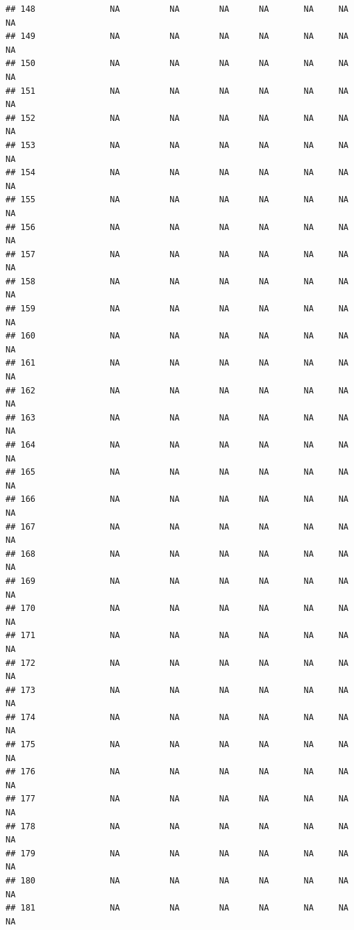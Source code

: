 \documentclass[
]{article}
\begin{document}
\begin{verbatim}
## 148               NA          NA        NA      NA       NA     NA     NA
## 149               NA          NA        NA      NA       NA     NA     NA
## 150               NA          NA        NA      NA       NA     NA     NA
## 151               NA          NA        NA      NA       NA     NA     NA
## 152               NA          NA        NA      NA       NA     NA     NA
## 153               NA          NA        NA      NA       NA     NA     NA
## 154               NA          NA        NA      NA       NA     NA     NA
## 155               NA          NA        NA      NA       NA     NA     NA
## 156               NA          NA        NA      NA       NA     NA     NA
## 157               NA          NA        NA      NA       NA     NA     NA
## 158               NA          NA        NA      NA       NA     NA     NA
## 159               NA          NA        NA      NA       NA     NA     NA
## 160               NA          NA        NA      NA       NA     NA     NA
## 161               NA          NA        NA      NA       NA     NA     NA
## 162               NA          NA        NA      NA       NA     NA     NA
## 163               NA          NA        NA      NA       NA     NA     NA
## 164               NA          NA        NA      NA       NA     NA     NA
## 165               NA          NA        NA      NA       NA     NA     NA
## 166               NA          NA        NA      NA       NA     NA     NA
## 167               NA          NA        NA      NA       NA     NA     NA
## 168               NA          NA        NA      NA       NA     NA     NA
## 169               NA          NA        NA      NA       NA     NA     NA
## 170               NA          NA        NA      NA       NA     NA     NA
## 171               NA          NA        NA      NA       NA     NA     NA
## 172               NA          NA        NA      NA       NA     NA     NA
## 173               NA          NA        NA      NA       NA     NA     NA
## 174               NA          NA        NA      NA       NA     NA     NA
## 175               NA          NA        NA      NA       NA     NA     NA
## 176               NA          NA        NA      NA       NA     NA     NA
## 177               NA          NA        NA      NA       NA     NA     NA
## 178               NA          NA        NA      NA       NA     NA     NA
## 179               NA          NA        NA      NA       NA     NA     NA
## 180               NA          NA        NA      NA       NA     NA     NA
## 181               NA          NA        NA      NA       NA     NA     NA

\end{verbatim}
\end{document}
